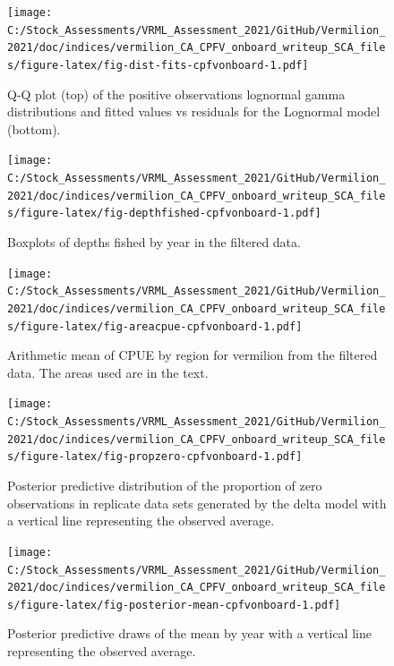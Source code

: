\documentclass[11pt,
  english,
  a4paper,
]{article}
\begin{document}
\FloatBarrier

\begin{figure}
\centering
\texttt{[image: C:/Stock\_Assessments/VRML\_Assessment\_2021/GitHub/Vermilion\_2021/doc/indices/vermilion\_CA\_CPFV\_onboard\_writeup\_SCA\_files/figure-latex/fig-dist-fits-cpfvonboard-1.pdf]}
\caption{\label{fig:fig-dist-fits-cpfvonboard}Q-Q plot (top) of the positive observations lognormal gamma distributions and fitted values vs residuals for the Lognormal model (bottom).}
\end{figure}

\begin{figure}
\centering
\texttt{[image: C:/Stock\_Assessments/VRML\_Assessment\_2021/GitHub/Vermilion\_2021/doc/indices/vermilion\_CA\_CPFV\_onboard\_writeup\_SCA\_files/figure-latex/fig-depthfished-cpfvonboard-1.pdf]}
\caption{\label{fig:fig-depthfished-cpfvonboard}Boxplots of depths fished by year in the filtered data.}
\end{figure}

\begin{figure}
\centering
\texttt{[image: C:/Stock\_Assessments/VRML\_Assessment\_2021/GitHub/Vermilion\_2021/doc/indices/vermilion\_CA\_CPFV\_onboard\_writeup\_SCA\_files/figure-latex/fig-areacpue-cpfvonboard-1.pdf]}
\caption{\label{fig:fig-areacpue-cpfvonboard}Arithmetic mean of CPUE by region for vermilion from the filtered data. The areas used are in the text.}
\end{figure}

\begin{figure}
\centering
\texttt{[image: C:/Stock\_Assessments/VRML\_Assessment\_2021/GitHub/Vermilion\_2021/doc/indices/vermilion\_CA\_CPFV\_onboard\_writeup\_SCA\_files/figure-latex/fig-propzero-cpfvonboard-1.pdf]}
\caption{\label{fig:fig-propzero-cpfvonboard}Posterior predictive distribution of the proportion of zero observations in replicate data sets generated by the delta model with a vertical line representing the observed average.}
\end{figure}

\begin{figure}
\centering
\texttt{[image: C:/Stock\_Assessments/VRML\_Assessment\_2021/GitHub/Vermilion\_2021/doc/indices/vermilion\_CA\_CPFV\_onboard\_writeup\_SCA\_files/figure-latex/fig-posterior-mean-cpfvonboard-1.pdf]}
\caption{\label{fig:fig-posterior-mean-cpfvonboard}Posterior predictive draws of the mean by year with a vertical line representing the observed average.}
\end{figure}
\end{document}
